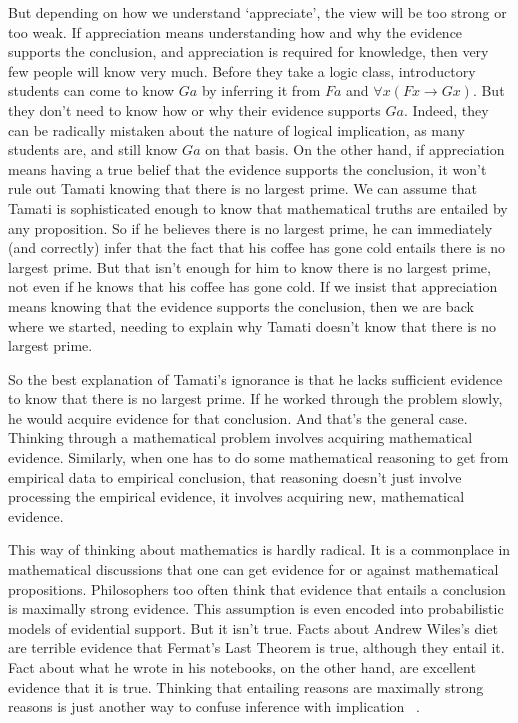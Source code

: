 But depending on how we understand `appreciate', the view will be too strong or too weak. If appreciation means understanding how and why the evidence supports the conclusion, and appreciation is required for knowledge, then very few people will know very much. Before they take a logic class, introductory students can come to know $Ga$ by inferring it from $Fa$ and $\forall x (Fx \rightarrow Gx)$. But they don't need to know how or why their evidence supports $Ga$. Indeed, they can be radically mistaken about the nature of logical implication, as many students are, and still know $Ga$ on that basis. On the other hand, if appreciation means having a true belief that the evidence supports the conclusion, it won't rule out \gls{Tamati} knowing that there is no largest prime. We can assume that \gls{Tamati} is sophisticated enough to know that mathematical truths are entailed by any proposition. So if he believes there is no largest prime, he can immediately (and correctly) infer that the fact that his coffee has gone cold entails there is no largest prime. But that isn't enough for him to know there is no largest prime, not even if he knows that his coffee has gone cold. If we insist that appreciation means knowing that the evidence supports the conclusion, then we are back where we started, needing to explain why \gls{Tamati} doesn't know that there is no largest prime.

So the best explanation of \gls{Tamati}'s ignorance is that he lacks sufficient evidence to know that there is no largest prime. If he worked through the problem slowly, he would acquire evidence for that conclusion. And that's the general case. Thinking through a mathematical problem involves acquiring mathematical evidence. Similarly, when one has to do some mathematical reasoning to get from empirical data to empirical conclusion, that reasoning doesn't just involve processing the empirical evidence, it involves acquiring new, mathematical evidence.

This way of thinking about mathematics is hardly radical. It is a commonplace in mathematical discussions that one can get evidence for or against mathematical propositions. Philosophers too often think that evidence that entails a conclusion is maximally strong evidence. This assumption is even encoded into probabilistic models of evidential support. But it isn't true. Facts about Andrew Wiles's diet are terrible evidence that Fermat's Last Theorem is true, although they entail it. Fact about what he wrote in his notebooks, on the other hand, are excellent evidence that it is true. Thinking that entailing reasons are maximally strong reasons is just another way to confuse inference with implication ~\citep{Harman1986}.

